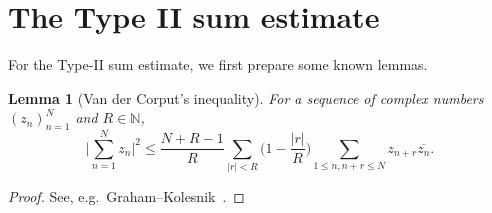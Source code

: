 \documentclass[hidelinks]{amsart}
\numberwithin{equation}{section}
\theoremstyle{plain}
\newtheorem{lemma}{Lemma}
\theoremstyle{definition}
\begin{document}
\section{The Type II sum estimate}
\label{sec:TypeII}
For the Type-II sum estimate, we first prepare some known lemmas.

\begin{lemma}[Van der Corput's inequality]
\label{lem:vdC_ineq}
For a sequence of complex numbers $(z_{n})_{n=1}^{N}$ and $R\in\mathbb{N}$,
\[
\biggl|
\sum_{n=1}^{N}z_{n}
\biggr|^{2}
\le
\frac{N+R-1}{R}
\sum_{|r|<R}\biggl(1-\frac{|r|}{R}\biggr)
\sum_{1\le n,n+r\le N}z_{n+r}\overline{z_{n}}.
\]
\end{lemma}
\begin{proof}
See, e.g.\ Graham--Kolesnik~\cite[Lemma~2.5, p.~10]{GrahamKolesnik}.
\end{proof}
\end{document}
